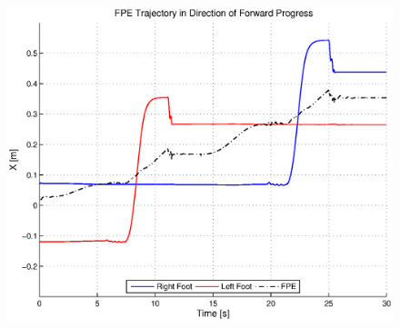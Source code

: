 \begin{figure}[!h]
	\centering
    \includegraphics[scale=0.7]{fig/simulations/fwdfpetraj.eps}
  	\caption{\Incomplete}
	\label{fig:fwdfpetraj}
\end{figure}

